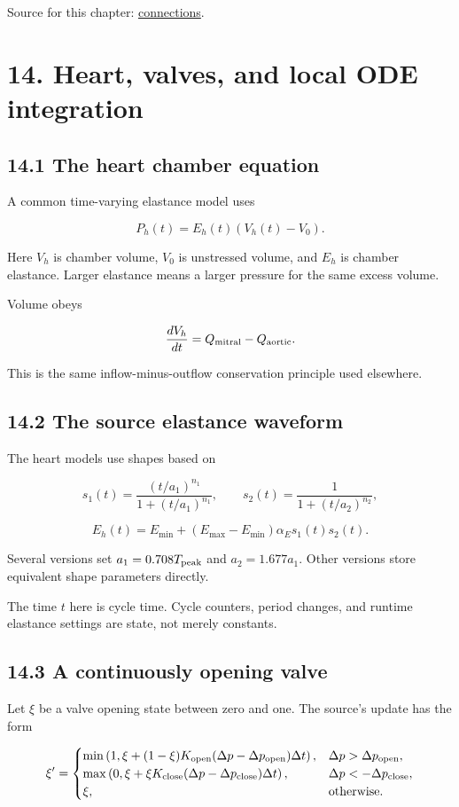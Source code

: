 \documentclass[11pt,a4paper]{article}
\begin{document}
Source for this chapter: \href{/home/sadid/starfish/SolverLib/classConnections.py}{connections}.

\clearpage
\section{14. Heart, valves, and local ODE integration}
\subsection{14.1 The heart chamber equation}
A common time-varying elastance model uses


\begingroup\small
\[
P_h(t)=E_h(t)\left(V_h(t)-V_0\right).
\]
\endgroup


Here \(V_h\) is chamber volume, \(V_0\) is unstressed volume, and \(E_h\) is chamber elastance. Larger elastance means a larger pressure for the same excess volume.

Volume obeys


\begingroup\small
\[
\frac{dV_h}{dt}=Q_{\rm mitral}-Q_{\rm aortic}.
\]
\endgroup


This is the same inflow-minus-outflow conservation principle used elsewhere.

\subsection{14.2 The source elastance waveform}
The heart models use shapes based on


\begingroup\small
\[
s_1(t)=
\frac{(t/a_1)^{n_1}}{1+(t/a_1)^{n_1}},
\qquad
s_2(t)=\frac1{1+(t/a_2)^{n_2}},
\]
\endgroup



\begingroup\small
\[
E_h(t)=E_{\min}
+(E_{\max}-E_{\min})\alpha_Es_1(t)s_2(t).
\]
\endgroup


Several versions set \(a_1=0.708T_{\rm peak}\) and \(a_2=1.677a_1\). Other versions store equivalent shape parameters directly.

The time \(t\) here is cycle time. Cycle counters, period changes, and runtime elastance settings are state, not merely constants.

\subsection{14.3 A continuously opening valve}
Let \(\xi\) be a valve opening state between zero and one. The source's update has the form


\begingroup\small
\[
\xi'=
\begin{cases}
\min\left(1,\xi+(1-\xi)K_{\rm open}
(\Delta p-\Delta p_{\rm open})\Delta t\right),
&\Delta p>\Delta p_{\rm open},\\
\max\left(0,\xi+\xi K_{\rm close}
(\Delta p-\Delta p_{\rm close})\Delta t\right),
&\Delta p<-\Delta p_{\rm close},\\
\xi,&\text{otherwise}.
\end{cases}
\]
\endgroup
\end{document}
